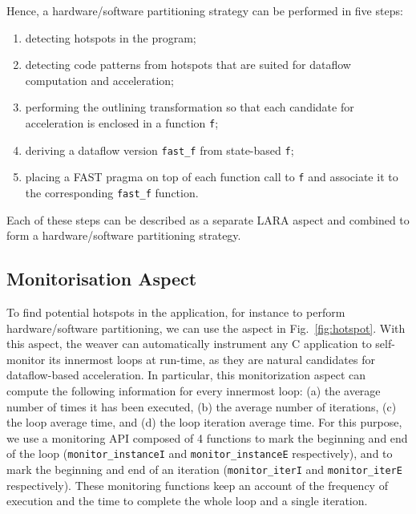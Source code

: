 \noindent

Hence, a hardware/software partitioning strategy can be performed in
five steps:
\begin{enumerate}
  \item detecting hotspots in the program;
  \item detecting code patterns from hotspots that are suited for
    dataflow computation and acceleration;
  \item performing the outlining transformation so that each
    candidate for acceleration is enclosed in a function \texttt{f};
  \item deriving a dataflow version \texttt{fast\_f} from state-based
    \texttt{f};
  \item placing a FAST pragma on top of each function call to
    \texttt{f} and associate it to the corresponding \texttt{fast\_f}
    function.
\end{enumerate}

Each of these steps can be described as a separate LARA aspect and
combined to form a hardware/software partitioning strategy.

\subsection{Monitorisation Aspect}
\label{sect:asp_mon}
To find potential hotspots in the application, for instance to perform
hardware/software partitioning, we can use the aspect in
Fig.~\ref{fig:hotspot}.  With this aspect, the weaver can
automatically instrument any C application to self-monitor its
innermost loops at run-time, as they are natural candidates for
dataflow-based acceleration. In particular, this monitorization aspect
can compute the following information for every innermost loop: (a)
the average number of times it has been executed, (b) the average
number of iterations, (c) the loop average time, and (d) the loop
iteration average time. For this purpose, we use a monitoring API
composed of 4 functions to mark the beginning and end of the loop
(\texttt{monitor\_instanceI} and \texttt{monitor\_instanceE}
respectively), and to mark the beginning and end of an iteration
(\texttt{monitor\_iterI} and \texttt{monitor\_iterE}
respectively). These monitoring functions keep an account of the
frequency of execution and the time to complete the whole loop and a
single iteration.

